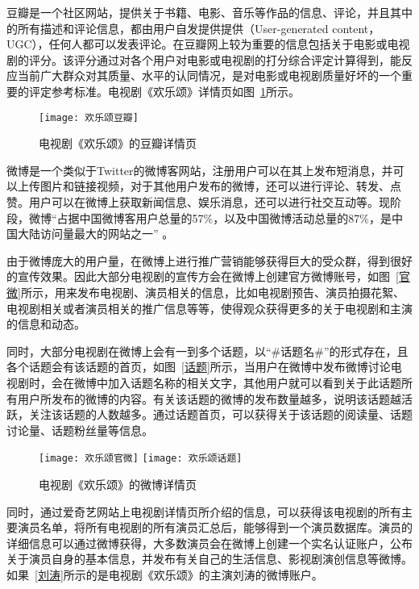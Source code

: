 豆瓣是一个社区网站，提供关于书籍、电影、音乐等作品的信息、评论，并且其中的所有描述和评论信息，都由用户自发提供提供（User-generated content， UGC），任何人都可以发表评论。在豆瓣网上较为重要的信息包括关于电影或电视剧的评分。该评分通过对各个用户对电影或电视剧的打分综合评定计算得到，能反应当前广大群众对其质量、水平的认同情况，是对电影或电视剧质量好坏的一个重要的评定参考标准。电视剧《欢乐颂》详情页如图~\ref{欢乐颂豆瓣}所示。

\begin{figure}[h] 
  \centering
  \texttt{[image: 欢乐颂豆瓣]}
  \caption{电视剧《欢乐颂》的豆瓣详情页}
  \label{欢乐颂豆瓣}
\end{figure}

微博是一个类似于Twitter的微博客网站，注册用户可以在其上发布短消息，并可以上传图片和链接视频，对于其他用户发布的微博，还可以进行评论、转发、点赞。用户可以在微博上获取新闻信息、娱乐消息，还可以进行社交互动等。现阶段，微博“占据中国微博客用户总量的57\%，以及中国微博活动总量的87\%，是中国大陆访问量最大的网站之一” \cite{微博维基}。

由于微博庞大的用户量，在微博上进行推广营销能够获得巨大的受众群，得到很好的宣传效果。因此大部分电视剧的宣传方会在微博上创建官方微博账号，如图~\ref{官微}所示，用来发布电视剧、演员相关的信息，比如电视剧预告、演员拍摄花絮、电视剧相关或者演员相关的推广信息等等，使得观众获得更多的关于电视剧和主演的信息和动态。

同时，大部分电视剧在微博上会有一到多个话题，以“\#话题名\#”的形式存在，且各个话题会有该话题的首页，如图~\ref{话题}所示，当用户在微博中发布微博讨论电视剧时，会在微博中加入话题名称的相关文字，其他用户就可以看到关于此话题所有用户所发布的微博的内容。有关该话题的微博的发布数量越多，说明该话题越活跃，关注该话题的人数越多。通过话题首页，可以获得关于该话题的阅读量、话题讨论量、话题粉丝量等信息。

\begin{figure}[h]
  \centering%
    {\texttt{[image: 欢乐颂官微]}}
      {\texttt{[image: 欢乐颂话题]}}
  \caption{电视剧《欢乐颂》的微博详情页}
\end{figure}

同时，通过爱奇艺网站上电视剧详情页所介绍的信息，可以获得该电视剧的所有主要演员名单，将所有电视剧的所有演员汇总后，能够得到一个演员数据库。演员的详细信息可以通过微博获得，大多数演员会在微博上创建一个实名认证账户，公布关于演员自身的基本信息，并发布有关自己的生活信息、影视剧演创信息等微博。如果~\ref{刘涛}所示的是电视剧《欢乐颂》的主演刘涛的微博账户。

